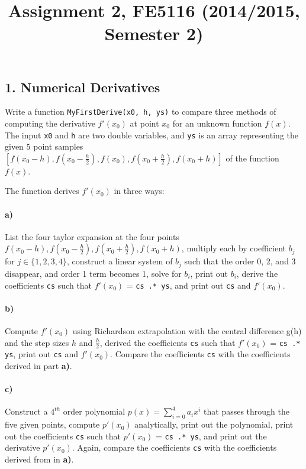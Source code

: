 \documentclass[12pt,a4paper,hidelinks,fleqn]{article}            %
\title{\vspace{-5ex}Assignment 2, FE5116 (2014/2015, Semester 2)\vspace{-7ex}}
\date{}
\begin{document}
\maketitle

\subsection*{1. Numerical Derivatives}
Write a function \verb=MyFirstDerive(x0, h, ys)= to compare three methods of computing the derivative $f'(x_0)$
at point $x_0$ for an unknown function $f(x)$.
The input \verb=x0= and \verb=h= are two double variables,
and \verb=ys= is an array representing the given 5 point samples $[f(x_0-h), f(x_0-\frac{h}{2}), f(x_0), f(x_0+\frac{h}{2}), f(x_0+h)]$
of the function $f(x)$.

The function derives $f'(x_0)$ in three ways:
\vspace{-6mm}
\paragraph{a)} List the four taylor expansion at the four points $f(x_0-h), f(x_0-\frac{h}{2}), f(x_0+\frac{h}{2}), f(x_0+h)$, 
multiply each by coefficient $b_j$ for $j\in\{1, 2, 3, 4\}$, 
construct a linear system of $b_j$ such that the order 0, 2, and 3 disappear, and order 1 term becomes 1, 
solve for $b_i$, 
print out $b_i$,
derive the coefficients \verb=cs= such that $f'(x_0)$ = \verb=cs .* ys=,
and print out \verb=cs= and $f'(x_0)$. 
\vspace{-6mm}
\paragraph{b)} Compute $f'(x_0)$ using Richardson extrapolation with the central difference g(h) and the step sizes $h$ and $\displaystyle \frac{h}{2}$,
derived the coefficients \verb=cs= such that $f'(x_0)$ = \verb=cs .* ys=,
print out \verb=cs= and $f'(x_0)$. Compare the coefficients \verb=cs= with the coefficients derived in part \textbf{a)}.
\vspace{-6mm}
\paragraph{c)} Construct a $4^{th}$ order polynomial $p(x) = \sum_{i=0}^4 a_i x^i$ that passes through the five given points, 
compute $p'(x_0)$ analytically, 
print out the polynomial,
print out the coefficients \verb=cs= such that $p'(x_0)$ = \verb=cs .* ys=,
and print out the derivative $p'(x_0)$.
Again, compare the coefficients \verb=cs= with the coefficients derived from in \textbf{a)}.
\end{document}

